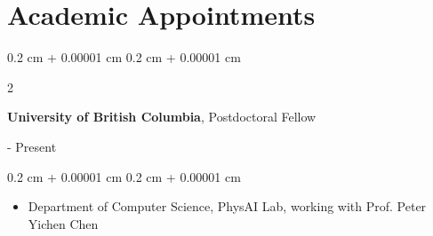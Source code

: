 \documentclass[10pt, letterpaper]{article}
\newenvironment{highlights}{
    \begin{itemize}[
        topsep=0.10 cm,
        parsep=0.10 cm,
        partopsep=0pt,
        itemsep=0pt,
        leftmargin=0.4 cm + 10pt
    ]
}{
    \end{itemize}
} %
\newenvironment{highlightsforbulletentries}{
    \begin{itemize}[
        topsep=0.10 cm,
        parsep=0.10 cm,
        partopsep=0pt,
        itemsep=0pt,
        leftmargin=10pt
    ]
}{
    \end{itemize}
} %
\newenvironment{onecolentry}{
    \begin{adjustwidth}{
        0.2 cm + 0.00001 cm
    }{
        0.2 cm + 0.00001 cm
    }
}{
    \end{adjustwidth}
} %
\newenvironment{twocolentry}[2][]{
    \onecolentry
    \def\secondColumn{#2}
    \setcolumnwidth{\fill, 4.5 cm}
    \begin{paracol}{2}
}{
    \switchcolumn \raggedleft \secondColumn
    \end{paracol}
    \endonecolentry
} %
\let\hrefWithoutArrow\href
\renewcommand{\href}[2]{\hrefWithoutArrow{#1}{\ifthenelse{\equal{#2}{}}{ }{#2 }\raisebox{.15ex}{\footnotesize \faExternalLink*}}}
\begin{document}

    \section{Academic Appointments}

        \begin{twocolentry}{
        2026.9 - Present}
            \textbf{University of British Columbia}, Postdoctoral Fellow
        \end{twocolentry}

        \vspace{0.10 cm}
        \begin{onecolentry}
            \begin{highlights}
                \item Department of Computer Science, PhysAI Lab, working with Prof. Peter Yichen Chen
            \end{highlights}
        \end{onecolentry}
\end{document}
